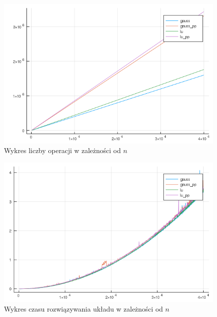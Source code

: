 \documentclass[12pt]{article}
\begin{document}
\begin{figure}[!htb]
	\centering
  		\includegraphics[width=\linewidth]{plot3_ops.png}
  		\caption{Wykres liczby operacji w zależności od $n$}
	\endminipage
\end{figure}

\clearpage
\begin{figure}[!htb]
	\centering
  		\includegraphics[width=\linewidth]{plot3_time.png}
  		\caption{Wykres czasu rozwiązywania układu w zależności od $n$}
	\endminipage
\end{figure}
\end{document}
